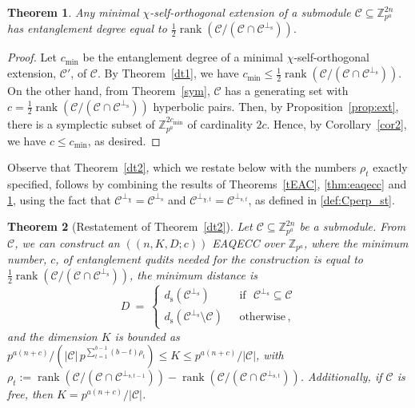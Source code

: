 \documentclass{article}
\DeclareMathOperator{\rank}{rank}
\def\Z{\mathbb{Z}}
\newtheorem{thm}{Theorem}[section]
\theoremstyle{remark}
\theoremstyle{definition}
\numberwithin{equation}{section}
\begin{document}
\begin{thm}\label{4thm} Any minimal $\chi$-self-orthogonal extension of a submodule $\mathcal{C} \subseteq \mathbb{Z}_{p^a}^{2n}$ has entanglement degree equal to $\frac12 \rank(\mathcal{C}/(\mathcal{C} \cap \mathcal{C}^{\perp_{\mathrm{s}}})).$
\end{thm}
\begin{proof} 
Let $c_{\min}$ be the entanglement degree of a minimal $\chi$-self-orthogonal extension, $\mathcal{C}'$, of $\mathcal{C}$. By Theorem~\ref{dt1}, we have $c_{\min} \le  \frac12 \rank(\mathcal{C}/(\mathcal{C} \cap \mathcal{C}^{\perp_{\mathrm{s}}})) $. On the other hand, from Theorem~\ref{sym}, $\mathcal{C}$ has a generating set with $c = \frac12 \rank(\mathcal{C}/(\mathcal{C} \cap \mathcal{C}^{\perp_{\mathrm{s}}}))$ hyperbolic pairs. Then, by Proposition~\ref{prop:ext}, there is a symplectic subset of $\mathbb{Z}_{p^a}^{2c_{\min}}$ of cardinality $2c$. Hence, by Corollary~\ref{cor2}, we have $c \le c_{\min}$, as desired.
\end{proof}

Observe that Theorem~\ref{dt2}, which we restate below with the numbers $\rho_t$ exactly specified,  follows by combining the results of Theorems~\ref{tEAC}, \ref{thm:eaqecc} and \ref{4thm}, using the fact that $\mathcal{C}^{\perp_\chi}=\mathcal{C}^{\perp_{\mathrm{s}}}$ and  $\mathcal{C}^{\perp_{\chi,t}}=\mathcal{C}^{\perp_{\mathrm{s},t}}$, as defined in \eqref{def:Cperp_st}.

\begin{thm}[Restatement of Theorem~\ref{dt2}] Let  $\mathcal{C} \subseteq \mathbb{Z}_{p^a}^{2n}$ be a submodule. From $\mathcal{C}$, we can construct an $((n,K, D; c))$ EAQECC over $\Z_{p^a}$, where the minimum number, $c$, of entanglement qudits needed for the construction is equal to $\frac12 \rank(\mathcal{C}/(\mathcal{C} \cap \mathcal{C}^{\perp_{\mathrm{s}}}))$,  the minimum distance is 
\begin{equation*}
D~=~\left\{\begin{array}{ll}
d_{\mathrm{s}}(\mathcal{C}^{\perp_{\mathrm{s}}}) & \text{~~if~~} \mathcal{C}^{\perp_{\mathrm{s}}} \subseteq \mathcal{C} \\  
d_{\mathrm{s}}(\mathcal{C}^{\perp_{\mathrm{s}}}\setminus \mathcal{C} )  & \text{~~otherwise} \, , \end{array}\right. 
\end{equation*}
and the dimension $K$ is bounded as $p^{a(n+c)}/ (|\mathcal{C}| \, {p^{\sum_{t=1}^{b-1} (b-t)\rho_t}}) \leq  K \leq p^{a(n+c)}/|\mathcal{C}|$, with $\rho_t:=\rank(\mathcal{C}/(\mathcal{C} \cap \mathcal{C}^{\perp_{\mathrm{s},t-1}}))-\rank(\mathcal{C}/(\mathcal{C} \cap \mathcal{C}^{\perp_{\mathrm{s},t}}))$.  Additionally, if $\mathcal{C}$ is free, then $K = p^{a(n+c)}/|\mathcal{C}|$.
 \end{thm}
\end{document}
